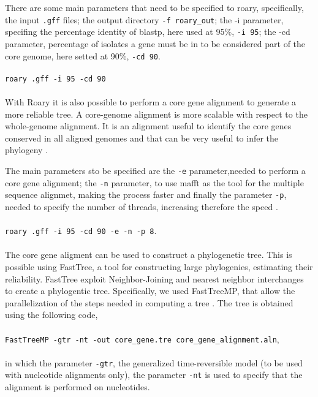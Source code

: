 \documentclass[a4paper,titlepage]{book}
\newcommand{\code}[1]{\colorbox{light-gray}{\texttt{#1}}}
\begin{document}
There are some main parameters that need to be specified to roary, specifically, the input \code{.gff} files; the output directory \code{-f roary\_out}; the -i parameter, specifing the percentage identity of blastp, here used at 95\%, \code{-i 95}; the -cd parameter, percentage of isolates a gene must be in to be considered part of the core genome, here setted at 90\%, \code{-cd 90}.
\\ \newline \\ \code{roary .gff -i 95 -cd 90} \\ \newline \\


With Roary it is also possible to perform a core gene alignment to generate a more reliable tree. A core-genome alignment is more scalable with respect to the whole-genome alignment. It is an alignment useful to identify the core genes conserved in all aligned genomes and that can be very useful to infer the phylogeny \cite{Core-align}.

The main parameters sto be specified are the \code{-e} parameter,needed to perform a core gene alignment; the \code{-n} parameter, to use mafft as the tool for the multiple sequence alignmet, making the process faster and finally the parameter \code{-p}, needed to specify the number of threads, increasing therefore the speed \cite{Roary}.
\\
\newline
\\
\code{roary .gff -i 95 -cd 90 -e -n -p 8}.
\\
\newline
\\
The core gene aligment can be used to construct a phylogenetic tree. This is possible using FastTree, a tool for constructing large phylogenies, estimating their reliability. FastTree exploit Neighbor-Joining and nearest neighbor interchanges to create a phylogentic tree. \cite{FastTree}
Specifically, we used FastTreeMP, that allow the parallelization of the steps needed in computing a tree \cite{FTMP}.
The tree is obtained using the following code,\\ \newline \\ \code{FastTreeMP -gtr -nt -out core\_gene.tre core\_gene\_alignment.aln},\\ \newline \\ in which the parameter \code{-gtr}, the generalized time-reversible model (to be used with nucleotide alignments only), the parameter \code{-nt} is used to specify that the alignment is performed on nucleotides.
\end{document}
